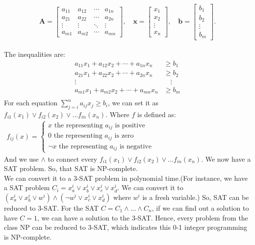 \documentclass{article}
\begin{document}
\[
\mathbf{A} = \begin{bmatrix}
a_{11} & a_{12} & \cdots & a_{1n} \\
a_{21} & a_{22} & \cdots & a_{2n} \\
\vdots & \vdots & \ddots & \vdots \\
a_{m1} & a_{m2} & \cdots & a_{mn}
\end{bmatrix}, \quad
\mathbf{x} = \begin{bmatrix}
x_1 \\
x_2 \\
\vdots \\
x_n
\end{bmatrix}, \quad
\mathbf{b} = \begin{bmatrix}
b_1 \\
b_2 \\
\vdots \\
b_m
\end{bmatrix}.
\]\\
The inequalities are:
\[
\begin{aligned}
a_{11}x_1 + a_{12}x_2 + \cdots + a_{1n}x_n &\geq b_1 \\
a_{21}x_1 + a_{22}x_2 + \cdots + a_{2n}x_n &\geq b_2 \\
\vdots \quad & \quad \vdots \\
a_{m1}x_1 + a_{m2}x_2 + \cdots + a_{mn}x_n &\geq b_m \\
\end{aligned}
\]
For each equation $\sum_{j=i}^{n} a_{ij}x_j \geq b_i$, we can set it as $f_{i1}(x_1) \lor f_{i2}(x_2) \lor \ldots f_{in}(x_n)$. Where $f$ is defined as:
$\begin{array}{l} 
  f_{ij}(x)=\left\{\begin{matrix} 
  x \text{ the representing $a_{ij}$ is positive} \\ 
  0 \text{ the representing $a_{ij}$ is zero} \\ 
  \lnot x \text{ the representing $a_{ij}$ is negative} 
\end{matrix}\right.    
\end{array}$
\\
And we use $\land$ to connect every $f_{i1}(x_1) \lor f_{i2}(x_2) \lor \ldots f_{in}(x_n)$. We now have a SAT problem. So, that SAT is NP-complete.\\
We can convert it to a 3-SAT problem in polynomial time.(For instance, we have a SAT problem $C_i=x_a^i \lor x_b^i \lor x_c^i\lor x_d^i$. We can convert it to $(x_a^i \lor x_b^i \lor w^i)\land(\lnot w^i \lor x_c^i\lor x_d^i)$ where $w^i$ is a fresh variable.) So, SAT can be reduced to 3-SAT. For the SAT $C=C_1 \land \ldots \land C_n$, if we can find out a solution to have $C=1$, we can have a solution to the 3-SAT. Hence, every problem from the class NP can be reduced to 3-SAT, which indicates this 0-1 integer programming is NP-complete.
\end{document}
